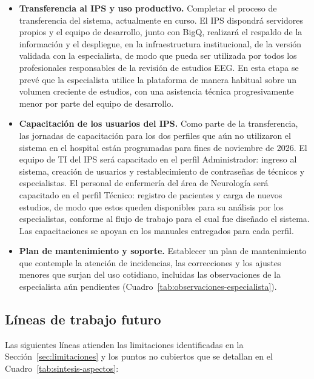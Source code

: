 \begin{itemize}
    \item \textbf{Transferencia al IPS y uso productivo.}
    Completar el proceso de transferencia del sistema, actualmente en curso.
    El IPS dispondrá servidores propios y el equipo de desarrollo, junto con BigQ, realizará el respaldo de la información y el despliegue, en la infraestructura institucional, de la versión validada con la especialista, de modo que pueda ser utilizada por todos los profesionales responsables de la revisión de estudios EEG.
    En esta etapa se prevé que la especialista utilice la plataforma de manera habitual sobre un volumen creciente de estudios, con una asistencia técnica progresivamente menor por parte del equipo de desarrollo.

    \item \textbf{Capacitación de los usuarios del IPS.}
    Como parte de la transferencia, las jornadas de capacitación para los dos perfiles que aún no utilizaron el sistema en el hospital están programadas para fines de noviembre de 2026.
    El equipo de TI del IPS será capacitado en el perfil Administrador: ingreso al sistema, creación de usuarios y restablecimiento de contraseñas de técnicos y especialistas.
    El personal de enfermería del área de Neurología será capacitado en el perfil Técnico: registro de pacientes y carga de nuevos estudios, de modo que estos queden disponibles para su análisis por los especialistas, conforme al flujo de trabajo para el cual fue diseñado el sistema.
    Las capacitaciones se apoyan en los manuales entregados para cada perfil.

    \item \textbf{Plan de mantenimiento y soporte.}
    Establecer un plan de mantenimiento que contemple la atención de incidencias, las correcciones y los ajustes menores que surjan del uso cotidiano, incluidas las observaciones de la especialista aún pendientes (Cuadro~\ref{tab:observaciones-especialista}).

\end{itemize}

\subsection{Líneas de trabajo futuro}
\label{subsec:lineas-futuras}

Las siguientes líneas atienden las limitaciones identificadas en la Sección~\ref{sec:limitaciones} y los puntos no cubiertos que se detallan en el Cuadro~\ref{tab:sintesis-aspectos}:

